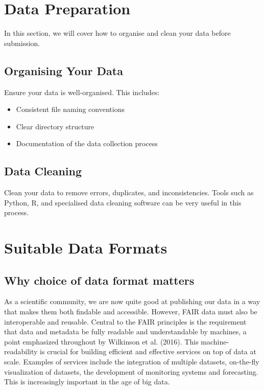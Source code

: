 \documentclass[a4paper,12pt]{article}
\begin{document}
\section{Data Preparation}
\label{sec:data-preparation}
In this section, we will cover how to organise and clean your data before submission.

\subsection{Organising Your Data}
Ensure your data is well-organised. This includes:
\begin{itemize}
    \item Consistent file naming conventions
    \item Clear directory structure
    \item Documentation of the data collection process
\end{itemize}

\subsection{Data Cleaning}
Clean your data to remove errors, duplicates, and inconsistencies. Tools such as Python, R, and specialised data cleaning software can be very useful in this process.

\section{Suitable Data Formats}
\label{sec:suitable-data-formats}

\subsection{Why choice of data format matters}

As a scientific community, we are now quite good at publishing our data in a way that makes them both findable and accessible. However, FAIR data must also be interoperable and reusable. Central to the FAIR principles is the requirement that data and metadata be fully readable and understandable by machines, a point emphasized throughout by Wilkinson et al. (2016). This machine-readability is crucial for building efficient and effective services on top of data at scale. Examples of services include the integration of multiple datasets, on-the-fly visualization of datasets, the development of monitoring systems and forecasting. This is increasingly important in the age of big data.
\end{document}
